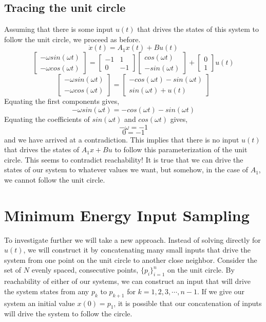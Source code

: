 \documentclass[12pt,letterpaper]{article}
\begin{document}
\subsection{Tracing the unit circle}
Assuming that there is some input $u(t)$ that drives the states of this system to follow the unit circle, we proceed as before.\\
\[\dot{x}(t) = A_{1}x(t) + Bu(t)\]
\[\begin{bmatrix} -\omega sin(\omega t) \\ -\omega cos(\omega t) \end{bmatrix} = \begin{bmatrix} -1 & 1 \\ 0 & -1 \end{bmatrix} \begin{bmatrix} cos(\omega t) \\ -sin(\omega t) \end{bmatrix} + \begin{bmatrix} 0 \\ 1 \end{bmatrix} u(t) \]
\[\begin{bmatrix} -\omega sin(\omega t) \\ -\omega cos(\omega t) \end{bmatrix} =  \begin{bmatrix} -cos(\omega t) -sin(\omega t) \\ sin(\omega t) + u(t) \end{bmatrix} \]
Equating the first components gives,
\[-\omega sin(\omega t) = -cos(\omega t) -sin(\omega t) \]
Equating the coefficients of $sin( \omega t)$ and $cos( \omega t)$ gives,
\[-\omega = -1\]
\[0 = -1\]
and we have arrived at a contradiction. This implies that there is no input $u(t)$ that drives the states of $A_{1}x+Bu$ to follow this parameterization of the unit circle. This seems to contradict reachability! It is true that we can drive the states of our system to whatever values we want, but somehow, in the case of $A_{1}$, we cannot follow the unit circle.

\section{Minimum Energy Input Sampling}
To investigate further we will take a new approach. Instead of solving directly for $u(t)$, we will construct it by concatenating many small inputs that drive the system from one point on the unit circle to another close neighbor.  Consider the set of $N$ evenly spaced, consecutive points, $\{p_{i}\}_{i=1}^{n}$ on the unit circle. By reachability of either of our systems, we can construct an input that will drive the system states from any $p_{k}$ to $p_{k+1}$ for $k=1,2,3,\cdots, n-1$. If we give our system an initial value $x(0) = p_{1}$, it is possible that our concatenation of inputs will drive the system to follow the circle. 
\end{document}
